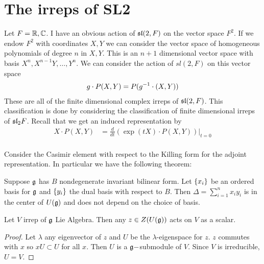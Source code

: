 \documentclass[12pt]{article}
\begin{document}
\section{The irreps of SL2}

Let $F = \R,\C$. I have an obvious action of $\sl(2,F)$ on the vector space $F^2$. If we endow $F^2$ with coordinates $X,Y$
we can consider the vector space of homogeneous polynomials of degree $n$ in $X,Y$. This is an $n+1$ dimensional
vector space with basis $X^n,X^{n-1}Y,\dots,Y^n$. 
We can consider the action of $sl(2,F)$ on this vector space \begin{align*}
    g\cdot P(X,Y) = P(\inv{g}\cdot (X,Y))
\end{align*} These are all of the finite dimensional complex irreps of $\sl(2,F)$. This classification is done
by considering the classification of finite dimensional irreps of $\mf{sl}_2F$. Recall that we get an induced representation
by \begin{align*}
    X\cdot P(X,Y) &= \frac{d}{dt}(\exp(tX)\cdot P(X,Y))\vert_{t=0}\\
\end{align*}

Consider the Casimir element with respect to the Killing form for the adjoint representation. In particular 
we have the following theorem: 
\begin{theorem}
    Suppose $\mf g$ has $B$ nondegenerate invariant bilinear form. Let $\set{x_i}$ be an ordered basis for $\mf g$
    and $\set{y_i}$ the dual basis with respect to $B$.
    Then $\Delta = \sum_{i=1}^n x_iy_i$ is in the center of $U(\mf g)$ and 
    does not depend on the choice of basis.
\end{theorem}

\begin{proposition}
    Let $V$ irrep of $\mf g$ Lie Algebra. Then any $z\in Z(U(\mf g))$ acts on $V$ as a scalar.
\end{proposition}
\begin{proof}
    Let $\lambda$ any eigenvector of $z$ and $U$ be the $\lambda$-eigenspace for $z$. $z$ commutes with $x$ 
    so $xU\subset U$ for all $x$. Then $U$ is a $\mf g-$submodule of $V$. Since $V$ is irreducible, $U = V$.
\end{proof} 
\end{document}
